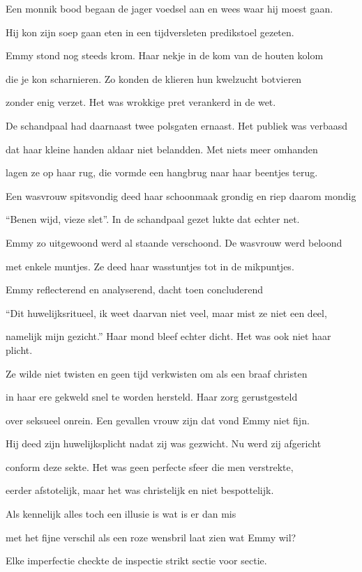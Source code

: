 Een monnik bood begaan
de jager voedsel aan
en wees waar hij moest gaan.

Hij kon zijn soep gaan eten
in een tijdversleten
predikstoel gezeten.

Emmy stond nog steeds krom.
Haar nekje in de kom
van de houten kolom

die je kon scharnieren.
Zo konden de klieren
hun kwelzucht botvieren

zonder enig verzet.
Het was wrokkige pret
verankerd in de wet.

De schandpaal had daarnaast
twee polsgaten ernaast.
Het publiek was verbaasd

dat haar kleine handen
aldaar niet belandden.
Met niets meer omhanden

lagen ze op haar rug,
die vormde een hangbrug
naar haar beentjes terug.

Een wasvrouw spitsvondig
deed haar schoonmaak grondig
en riep daarom mondig

“Benen wijd, vieze slet”.
In de schandpaal gezet
lukte dat echter net.

Emmy zo uitgewoond
werd al staande verschoond.
De wasvrouw werd beloond

met enkele muntjes.
Ze deed haar wasstuntjes
tot in de mikpuntjes.

Emmy reflecterend
en analyserend,
dacht toen concluderend

“Dit huwelijksritueel,
ik weet daarvan niet veel,
maar mist ze niet een deel,

namelijk mijn gezicht.”
Haar mond bleef echter dicht.
Het was ook niet haar plicht.

Ze wilde niet twisten
en geen tijd verkwisten
om als een braaf christen

in haar ere gekweld
snel te worden hersteld.
Haar zorg gerustgesteld

over seksueel onrein.
Een gevallen vrouw zijn
dat vond Emmy niet fijn.

Hij deed zijn huwelijksplicht
nadat zij was gezwicht.
Nu werd zij afgericht

conform deze sekte.
Het was geen perfecte
sfeer die men verstrekte,

eerder afstotelijk,
maar het was christelijk
en niet bespottelijk.

Als kennelijk alles
toch een illusie is
wat is er dan mis

met het fijne verschil
als een roze wensbril
laat zien wat Emmy wil?

Elke imperfectie
checkte de inspectie
strikt sectie voor sectie.

